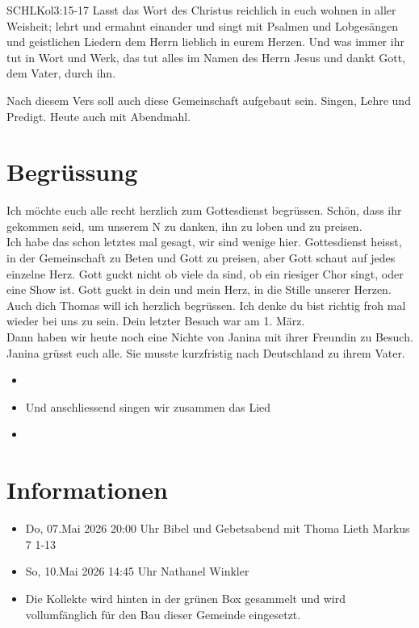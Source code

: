 \documentclass[fontsize=14pt]{mybib}
\newcommand{\Name}{Thomas}
\begin{document}
\begin{bibelbox}{SCHL}{Kol}{3:15-17}
    Lasst das Wort des Christus reichlich in euch wohnen in aller Weisheit; lehrt und ermahnt einander und singt mit Psalmen und Lobgesängen und geistlichen Liedern dem Herrn lieblich in eurem Herzen. Und was immer ihr tut in Wort und Werk, das tut alles im Namen des Herrn Jesus und dankt Gott, dem Vater, durch ihn.
\end{bibelbox}
Nach diesem Vers soll auch diese Gemeinschaft aufgebaut sein. Singen, Lehre und Predigt. Heute auch mit Abendmahl.
\section{Begrüssung}
Ich möchte euch alle recht herzlich zum Gottesdienst begrüssen. Schön, dass ihr gekommen seid, um unserem \herr N zu danken, ihn zu loben und zu preisen.\\
Ich habe das schon letztes mal gesagt, wir sind wenige hier. Gottesdienst heisst, in der Gemeinschaft zu Beten und Gott zu preisen, aber Gott schaut auf jedes einzelne Herz. Gott guckt nicht ob viele da sind, ob ein riesiger Chor singt, oder eine Show ist. Gott guckt in dein und mein Herz, in die Stille unserer Herzen. \\
Auch dich \Name{} will ich herzlich begrüssen. Ich denke du bist richtig froh mal wieder bei uns zu sein. Dein letzter Besuch war am 1. März.\\
Dann haben wir heute noch eine Nichte von Janina mit ihrer Freundin zu Besuch.\\
Janina grüsst euch alle. Sie musste kurzfristig nach Deutschland zu ihrem Vater. 
\begin{itemize}
    \item[] 
    \item[] Und anschliessend singen wir zusammen das Lied
    \item[] 
\end{itemize}
\newpage
\section{Informationen}
\begin{itemize}
    \item {} Do, 07.Mai 2026 20:00 Uhr Bibel und Gebetsabend mit Thoma Lieth Markus 7 1-13
    \item {} So, 10.Mai 2026 14:45 Uhr Nathanel Winkler

    \item {} Die Kollekte wird hinten in der grünen Box gesammelt und wird vollumfänglich für den Bau dieser Gemeinde eingesetzt.
\end{itemize}
\end{document}
